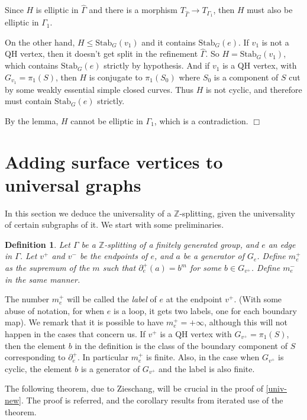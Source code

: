 \documentclass[12pt]{amsart}
\newtheorem{definition}[theorem]{Definition}
\newcommand{\Z}{\mathbb{Z}}
\newcommand{\Stab}{\mbox{Stab}}
\begin{document}
Since $H$ is elliptic in $\hat \Gamma$ and there is a morphism $T_{\hat\Gamma} \to T_{\Gamma_1}$, then $H$ must also be elliptic in $\Gamma_1$.

On the other hand, $H\leq \Stab_G(v_1)$ and it contains $\Stab_G(e)$. If $v_1$ is not a QH vertex, then it doesn't get split in the refinement $\hat\Gamma$. So $H=\Stab_G(v_1)$, which contains $\Stab_G(e)$ strictly by hypothesis. And if $v_1$ is a QH vertex, with $G_{v_1}=\pi_1(S)$, then $H$ is conjugate to $\pi_1(S_0)$ where $S_0$ is a component of $S$ cut by some weakly essential simple closed curves. Thus $H$ is not cyclic, and therefore must contain $\Stab_G(e)$ strictly.

By the lemma, $H$ cannot be elliptic in $\Gamma_1$, which is a contradiction. $\Box$  


\section{Adding surface vertices to universal graphs} \label{s-univ}

In this section we deduce the universality of a $\Z$-splitting, given the universality of certain subgraphs of it. We start with some preliminaries.

\begin{definition} \label{labs} Let $\Gamma$ be a $\Z$-splitting of a finitely generated group, and $e$ an edge in $\Gamma$. Let $v^+$ and $v^-$ be the endpoints of $e$, and $a$ be a generator of $G_e$. Define $m_e^+$ as the supremum of the $m$ such that $\partial_e^+(a)=b^m$ for some $b\in G_{v^+}$. Define $m^-_e$ in the same manner. 
\end{definition}

The number $m^+_e$ will be called the {\em label} of $e$ at the endpoint $v^+$. (With some abuse of notation, for when $e$ is a loop, it gets two labels, one for each boundary map). We remark that it is possible to have $m^+_e=+\infty$, although this will not happen in the cases that concern us. If $v^+$ is a QH vertex with $G_{v^+}=\pi_1(S)$, then the element $b$ in the definition is the class of the boundary component of $S$ corresponding to $\partial_e^+$. In particular $m^+_e$ is finite. Also, in the case when $G_{v^+}$ is cyclic, the element $b$ is a generator of $G_{v^+}$ and the label is also finite.  

The following theorem, due to Zieschang, will be crucial in the proof of \ref{univ-new}. The proof is referred, and the corollary results from iterated use of the theorem.
\end{document}
